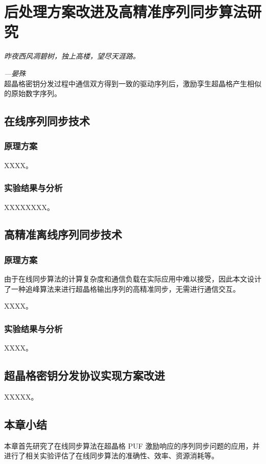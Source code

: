\chapter{后处理方案改进及高精准序列同步算法研究}
\label{ch3}
\emph{\kaishu 昨夜西风凋碧树，独上高楼，望尽天涯路。}

\emph{\kaishu \hfill ---晏殊}\\

超晶格密钥分发过程中通信双方得到一致的驱动序列后，激励孪生超晶格产生相似的原始数字序列。


\section{在线序列同步技术}
\subsection{原理方案}
XXXX。





\subsection{实验结果与分析}

XXXXXXXX。

\section{高精准离线序列同步技术}

\subsection{原理方案}
由于在线同步算法的计算复杂度和通信负载在实际应用中难以接受，因此本文设计了一种追峰算法来进行超晶格输出序列的高精准同步，无需进行通信交互。

XXXX。

\subsection{实验结果与分析}

XXXX。




\section{超晶格密钥分发协议实现方案改进}

XXXXX。

\section{本章小结}
本章首先研究了在线同步算法在超晶格 PUF 激励响应的序列同步问题的应用，并进行了相关实验评估了在线同步算法的准确性、效率、资源消耗等。

